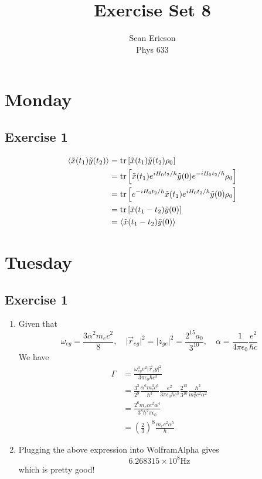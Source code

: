 \documentclass[12pt]{article}
\newcommand{\magsq}[1]{\big|#1\big|^2}
\begin{document}
	
\title{Exercise Set 8}
\author{Sean Ericson \\ Phys 633}
\maketitle

\section*{Monday}
\subsection*{Exercise 1}
\begin{align*}
    \ev{\tilde{x}(t_1)\tilde{y}(t_2)} &= \tr\left[\tilde{x}(t_1)\tilde{y}(t_2)\rho_0\right] \\
    &= \tr\left[\tilde{x}(t_1)e^{iH_0t_2/\hbar}\tilde{y}(0)e^{-iH_0t_2/\hbar}\rho_0\right] \\
    &= \tr\left[e^{-iH_0t_2/\hbar}\tilde{x}(t_1)e^{iH_0t_2/\hbar}\tilde{y}(0)\rho_0\right] \\
    &= \tr\left[\tilde{x}(t_1-t_2)\tilde{y}(0)\right] \\
    &= \ev{\tilde{x}(t_1-t_2)\tilde{y}(0)}
\end{align*}

\section*{Tuesday}
\subsection*{Exercise 1}
\begin{enumerate}[label=(\alph*)]
    \item Given that
    \[ \omega_{eg} = \frac{3\alpha^2m_ec^2}{8}, \quad \magsq{\vec{r}_{eg}} = \magsq{z_{ge}} = \frac{2^{15}a_0}{3^{10}}, \quad \alpha = \frac{1}{4\pi\epsilon_0}\frac{e^2}{\hbar c} \]
    We have
    \begin{align*}
        \Gamma &= \frac{\omega_{eg}^3e^2\magsq{\vec{r}_eg}}{3\pi\epsilon_0\hbar c^3} \\
        &= \frac{3^3}{2^9} \frac{\alpha^6m_e^3c^6}{\hbar^3}\frac{e^2}{3\pi\epsilon_0\hbar c^3}\frac{2^{15}}{3^{10}}\frac{\hbar^2}{m_e^2c^2\alpha^2} \\
        &= \frac{2^6m_ece^2\alpha^4}{3^8\hbar^2\pi\epsilon_0} \\
        &= \left(\frac{2}{3}\right)^8\frac{m_ec^2\alpha^5}{\hbar}
    \end{align*}

    \item Plugging the above expression into WolframAlpha gives
    \[ 6.268315\times10^8 \text{Hz} \]
    which is pretty good!
\end{enumerate}
\end{document}
